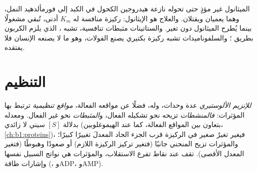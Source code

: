 \begin{example}\label{ex:b1:enzymes:medicine}
الميثانول غير مؤذٍ حتى تحوله نازعة هيدروجين الكحول في الكبد إلى
فورمألدهيد  النمل، وهما يعميان ويقتلان. والعلاج هو الإيثانول:
ركيزة منافسة له $K_m$ أدنى، تُبقي  مشغولًا بينما يُطرح
الميثانول دون تغير. والستاتينات مثبطات تنافسية، تشبه ،  الذي يلزم الكربون بطريق ؛ والسلفوناميدات
تشبه ركيزة  بكتيري يصنع الفولات، وهو ما لا يصنعه الإنسان فلا
يفتقده.
\end{example}

\section{التنظيم}

\begin{definition}\label{def:b1:enzymes:allosteric}
\emph{للإنزيم الألوستيري} عدة وحدات، وله، فضلًا
عن مواقعه الفعالة، \emph{مواقع تنظيمية} ترتبط بها المؤثرات:
\emph{فالمنشطات} تزيحه نحو تشكيله الفعال، و\emph{المثبطات} نحو غير
الفعال. ومعدله بدلالة $[S]$ سيني لا زائدي (بتعاون بين المواقع
الفعالة، كما عند الهيموغلوبين، \cref{ch:b1:proteins})، فيغير تغيرٌ
صغير في الركيزة قرب الجزء الحاد المعدلَ تغييرًا كبيرًا؛ والمؤثرات
تزيح المنحني جانبًا (فتغير تركيز الركيزة اللازم) أو صعودًا وهبوطًا
(فتغير المعدل الأقصى).   تقف عند نقاط تفرع
الاستقلاب، والمؤثرات هي نواتج السبيل نفسها وإشارات طاقة  (،
وADP، وAMP).
\end{definition}


